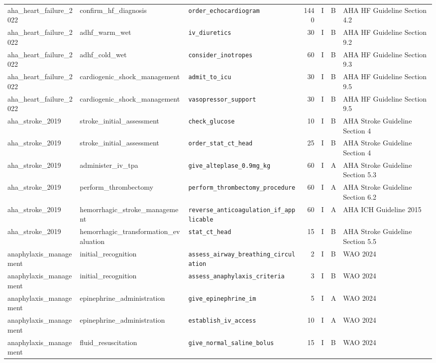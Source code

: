 \begin{longtable}{lllrrll}
aha\_heart\_failure\_2022 & confirm\_hf\_diagnosis & \texttt{order\_echocardiogram} & 1440 & I & B & AHA HF Guideline Section 4.2 \\
aha\_heart\_failure\_2022 & adhf\_warm\_wet & \texttt{iv\_diuretics} & 30 & I & B & AHA HF Guideline Section 9.2 \\
aha\_heart\_failure\_2022 & adhf\_cold\_wet & \texttt{consider\_inotropes} & 60 & I & B & AHA HF Guideline Section 9.3 \\
aha\_heart\_failure\_2022 & cardiogenic\_shock\_management & \texttt{admit\_to\_icu} & 30 & I & B & AHA HF Guideline Section 9.5 \\
aha\_heart\_failure\_2022 & cardiogenic\_shock\_management & \texttt{vasopressor\_support} & 30 & I & B & AHA HF Guideline Section 9.5 \\
aha\_stroke\_2019 & stroke\_initial\_assessment & \texttt{check\_glucose} & 10 & I & B & AHA Stroke Guideline Section 4 \\
aha\_stroke\_2019 & stroke\_initial\_assessment & \texttt{order\_stat\_ct\_head} & 25 & I & B & AHA Stroke Guideline Section 4 \\
aha\_stroke\_2019 & administer\_iv\_tpa & \texttt{give\_alteplase\_0.9mg\_kg} & 60 & I & A & AHA Stroke Guideline Section 5.3 \\
aha\_stroke\_2019 & perform\_thrombectomy & \texttt{perform\_thrombectomy\_procedure} & 60 & I & A & AHA Stroke Guideline Section 6.2 \\
aha\_stroke\_2019 & hemorrhagic\_stroke\_management & \texttt{reverse\_anticoagulation\_if\_applicable} & 60 & I & A & AHA ICH Guideline 2015 \\
aha\_stroke\_2019 & hemorrhagic\_transformation\_evaluation & \texttt{stat\_ct\_head} & 15 & I & B & AHA Stroke Guideline Section 5.5 \\
anaphylaxis\_management & initial\_recognition & \texttt{assess\_airway\_breathing\_circulation} & 2 & I & B & WAO 2024 \\
anaphylaxis\_management & initial\_recognition & \texttt{assess\_anaphylaxis\_criteria} & 3 & I & B & WAO 2024 \\
anaphylaxis\_management & epinephrine\_administration & \texttt{give\_epinephrine\_im} & 5 & I & A & WAO 2024 \\
anaphylaxis\_management & epinephrine\_administration & \texttt{establish\_iv\_access} & 10 & I & A & WAO 2024 \\
anaphylaxis\_management & fluid\_resuscitation & \texttt{give\_normal\_saline\_bolus} & 15 & I & B & WAO 2024 \\

\end{longtable}
